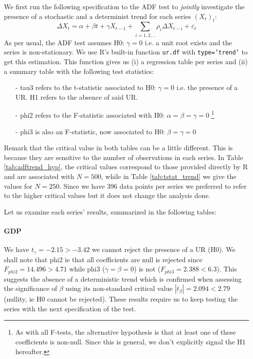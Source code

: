 \documentclass[hidelinks,12pts]{article}
\DeclareMathOperator{\1}{\mathbbm{1}}
\begin{document}
We first run the following specification to the ADF test to \emph{jointly} investigate the presence of a stochastic and a determinist trend for each series $(X_t)_t$: 
    \begin{equation}
        \Delta X_t = \alpha + \beta t + \gamma X_{t-1} +\sum_{i=1,2,..}\rho_i \Delta X_{t-i} + \varepsilon_t
    \end{equation}
As per usual, the ADF test assumes H0: $\gamma =0$ i.e. a unit root exists and the series is non-stationary.
We use R's built-in function \texttt{ur.df} with \texttt{type='trend'} to get this estimation. This function gives us (i) a regression table per series and (ii) a summary table with the following test statistics: 
    \begin{itemize}
        \item[-] tau3 refers to the t-statistic associated to H0: $\gamma =0$ i.e. the presence of a UR. H1 refers to the absence of said UR.
        \item[-] phi2 refers to the F-statistic associated with H0: $\alpha = \beta = \gamma =0$ \footnote{As with all F-tests, the alternative hypothesis is that at least one of these coefficients is non-null. Since this is general, we don't explicitly signal the H1 hereafter.}
        \item[-] phi3 is also an F-statistic, now associated to H0: $\beta =\gamma = 0$  
    \end{itemize}
Remark that the critical value in both tables can be a little different. This is because they are sensitive to the number of observations in each series. In Table \ref{tab:adftrend_hyp}, the critical values correspond to those provided directly by R and are associated with $N=500$, while in Table \ref{tab:tstat_trend} we give the values for $N=250$. Since we have 396 data points per series we preferred to refer to the higher critical values but it does not change the analysis done.

Let us examine each series' results, summarized in the following tables: 


%


\paragraph{GDP}
We have $t_\gamma = -2.15 > -3.42$ we cannot reject the presence of a UR (H0). 
We shall note that phi2 ie that all coefficients are null is rejected since $F_{phi2} = 14.496 > 4.71$ while phi3 ($\gamma = \beta =0$) is not ($F_{phi3} = 2.388 < 6.3$). 
This suggests the absence of a deterministic trend which is confirmed when assessing the significance of $\beta$ using its non-standard critical value $|t_\beta| = 2.094 < 2.79$ (nullity, ie H0 cannot be rejected). 
These results require us to keep testing the series with the next specification of the test. 
\end{document}
